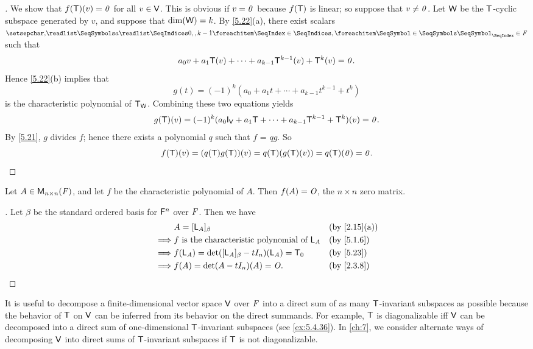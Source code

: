 \begin{proof}[]
	We show that \(f(\mathsf{T})(v) = \mathit{0}\) for all \(v \in \mathsf{V}\).
	This is obvious if \(v = \mathit{0}\) because \(f(\mathsf{T})\) is linear;
	so suppose that \(v \neq \mathit{0}\).
	Let \(\mathsf{W}\) be the \(\mathsf{T}\)-cyclic subspace generated by \(v\), and suppose that \(\dim(\mathsf{W}) = k\).
	By \cref{5.22}(a), there exist scalars \(\seq{a}{0,,k-1} \in \F\) such that
	\[
		a_0 v + a_1 \mathsf{T}(v) + \cdots + a_{k - 1} \mathsf{T}^{k - 1}(v) + \mathsf{T}^k(v) = \mathit{0}.
	\]
	Hence \cref{5.22}(b) implies that
	\[
		g(t) = (-1)^k (a_0 + a_1 t + \cdots + a_{k - 1} t^{k - 1} + t^k)
	\]
	is the characteristic polynomial of \(\mathsf{T}_{\mathsf{W}}\).
	Combining these two equations yields
	\[
		g(\T)(v) = (-1)^k (a_0 \IT[\V] + a_1 \T + \cdots + a_{k - 1} \T^{k - 1} + \T^k)(v) = \zv.
	\]
	By \cref{5.21}, \(g\) divides \(f\);
	hence there exists a polynomial \(q\) such that \(f\) = \(qg\).
	So
	\[
		f(\mathsf{T})(v) = (q(\mathsf{T}) g(\mathsf{T}))(v) = q(\mathsf{T})(g(\mathsf{T})(v)) = q(\mathsf{T})(\mathit{0}) = \mathit{0}.
	\]
\end{proof}

\begin{cor}\label{5.4.4}
	Let \(A \in \mathsf{M}_{{n} \times n}({\mathit{F}})\), and let \(f\) be the characteristic polynomial of \(A\).
	Then \(f(A) = \mathit{O}\), the \(n \times n\) zero matrix.
\end{cor}

\begin{proof}[]
	Let \(\beta\) be the standard ordered basis for \(\mathsf{F}^n\) over \(\mathit{F}\).
	Then we have
	\begin{align*}
		         & A = [\L_A]_{\beta}                                  &  & \by{2.15}[a] \\
		\implies & f \text{ is the characteristic polynomial of } \L_A &  & \by{5.1.6}   \\
		\implies & f(\L_A) = \det([\L_A]_{\beta} - t I_n)(\L_A) = \zT  &  & \by{5.23}    \\
		\implies & f(A) = \det(A - t I_n)(A) = \zm.                    &  & \by{2.3.8}
	\end{align*}
\end{proof}

\begin{note}
	It is useful to decompose a finite-dimensional vector space \(\mathsf{V}\) over \(\mathit{F}\) into a direct sum of as many \(\mathsf{T}\)-invariant subspaces as possible because the behavior of \(\mathsf{T}\) on \(\mathsf{V}\) can be inferred from its behavior on the direct summands.
	For example, \(\mathsf{T}\) is diagonalizable iff \(\mathsf{V}\) can be decomposed into a direct sum of one-dimensional \(\mathsf{T}\)-invariant subspaces (see \cref{ex:5.4.36}).
	In \cref{ch:7}, we consider alternate ways of decomposing \(\mathsf{V}\) into direct sums of \(\mathsf{T}\)-invariant subspaces if \(\mathsf{T}\) is not diagonalizable.
\end{note}

